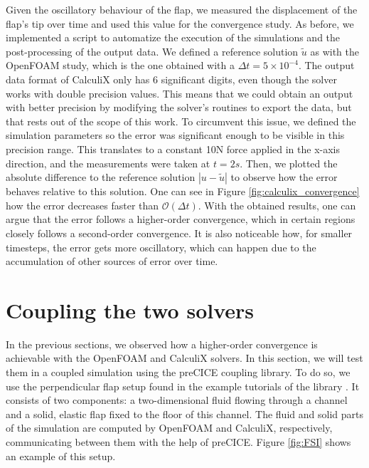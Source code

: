 \documentclass[
  english,        %
  font=times,     %
  onecolumn,      %
]{tumarticle}
\begin{document}
Given the oscillatory behaviour of the flap, we measured the displacement of the flap's tip over time and used this value for the convergence study. As before, we implemented a script to automatize the execution of the simulations and the post-processing of the output data. We defined a reference solution $\tilde{u}$ as with the OpenFOAM study, which is the one obtained with a $\Delta t = 5\times 10^{-4}$. The output data format of CalculiX only has 6 significant digits, even though the solver works with double precision values. This means that we could obtain an output with better precision by modifying the solver's routines to export the data, but that rests out of the scope of this work. To circumvent this issue, we defined the simulation parameters so the error was significant enough to be visible in this precision range. This translates to a constant 10N force applied in the x-axis direction, and the measurements were taken at $t=2s$. Then, we plotted the absolute difference to the reference solution $|u - \tilde{u}|$ to observe how the error behaves relative to this solution. One can see in Figure \ref{fig:calculix_convergence} how the error decreases faster than $\mathcal{O}(\Delta t)$. With the obtained results, one can argue that the error follows a higher-order convergence, which in certain regions closely follows a second-order convergence. It is also noticeable how, for smaller timesteps, the error gets more oscillatory, which can happen due to the accumulation of other sources of error over time.


\section{Coupling the two solvers} \label{FSI_sec}

In the previous sections, we observed how a higher-order convergence is achievable with the OpenFOAM and CalculiX solvers. In this section, we will test them in a coupled simulation using the preCICE coupling library. To do so, we use the perpendicular flap setup found in the example tutorials of the library \cite{perpendicularFlap}. It consists of two components: a two-dimensional fluid flowing through a channel and a solid, elastic flap fixed to the floor of this channel. The fluid and solid parts of the simulation are computed by OpenFOAM and CalculiX, respectively, communicating between them with the help of preCICE. Figure \ref{fig:FSI} shows an example of this setup.
\end{document}
